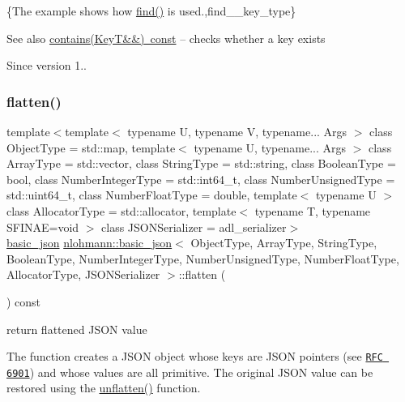 \{The example shows how {\ttfamily \mbox{\hyperlink{classnlohmann_1_1basic__json_a89eb3928f57903677051c80534be9cb1}{find()}}} is used.,find\+\_\+\+\_\+key\+\_\+type\}

\begin{DoxySeeAlso}{See also}
\mbox{\hyperlink{classnlohmann_1_1basic__json_a9286acdc0578fc66e9346323e69fc0e3}{contains(\+Key\+T\&\&) const}} -- checks whether a key exists
\end{DoxySeeAlso}
\begin{DoxySince}{Since}
version 1.. 
\end{DoxySince}
\mbox{\label{classnlohmann_1_1basic__json_ab838f000d76662917ffd6ec529569e03}} 
\subsubsection{\texorpdfstring{flatten()}{flatten()}}
{\footnotesize\ttfamily template$<$template$<$ typename U, typename V, typename... Args $>$ class Object\+Type = std\+::map, template$<$ typename U, typename... Args $>$ class Array\+Type = std\+::vector, class String\+Type  = std\+::string, class Boolean\+Type  = bool, class Number\+Integer\+Type  = std\+::int64\+\_\+t, class Number\+Unsigned\+Type  = std\+::uint64\+\_\+t, class Number\+Float\+Type  = double, template$<$ typename U $>$ class Allocator\+Type = std\+::allocator, template$<$ typename T, typename S\+F\+I\+N\+A\+E=void $>$ class J\+S\+O\+N\+Serializer = adl\+\_\+serializer$>$ \\
\mbox{\hyperlink{classnlohmann_1_1basic__json}{basic\+\_\+json}} \mbox{\hyperlink{classnlohmann_1_1basic__json}{nlohmann\+::basic\+\_\+json}}$<$ Object\+Type, Array\+Type, String\+Type, Boolean\+Type, Number\+Integer\+Type, Number\+Unsigned\+Type, Number\+Float\+Type, Allocator\+Type, J\+S\+O\+N\+Serializer $>$\+::flatten (\begin{DoxyParamCaption}{ }\end{DoxyParamCaption}) const\hspace{0.3cm}{\ttfamily [inline]}}



return flattened J\+S\+ON value 

The function creates a J\+S\+ON object whose keys are J\+S\+ON pointers (see \href{https://tools.ietf.org/html/rfc6901}{\tt R\+FC 6901}) and whose values are all primitive. The original J\+S\+ON value can be restored using the \mbox{\hyperlink{classnlohmann_1_1basic__json_a74fa3ab2003f2f6f2b69deaafed9126d}{unflatten()}} function.

